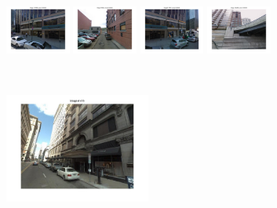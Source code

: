 \begin{figure}[t!]
\begin{minipage}{0.75\linewidth}
            \begin{minipage}{\linewidth}
                \colorbox{myRed}{\includegraphics[trim = 35mm 30mm 35mm 30mm, clip=true, height=16mm]{imgs/Pval/exMix09/mix01.jpg}}
                \colorbox{myGreen}{\includegraphics[trim = 35mm 30mm 35mm 30mm, clip=true, height=16mm]{imgs/Pval/exMix09/mix02.jpg}}
                \colorbox{myRed}{\includegraphics[trim = 35mm 30mm 35mm 30mm, clip=true, height=16mm]{imgs/Pval/exMix09/mix03.jpg}}
                \colorbox{myRed}{\includegraphics[trim = 35mm 30mm 35mm 30mm, clip=true, height=16mm]{imgs/Pval/exMix09/mix04.jpg}}
            \end{minipage} 
        \end{minipage}
        \vspace{3mm}
        \\
        \begin{minipage}{0.34\linewidth}
            \centering
            \vspace{0mm}
            \includegraphics[trim = 45mm 40mm 45mm 30mm, clip=true, height=36mm]{imgs/Pval/exMix19/query.jpg}
        \end{minipage}
        \begin{minipage}{0.75\linewidth}

\end{minipage}
\end{figure}
